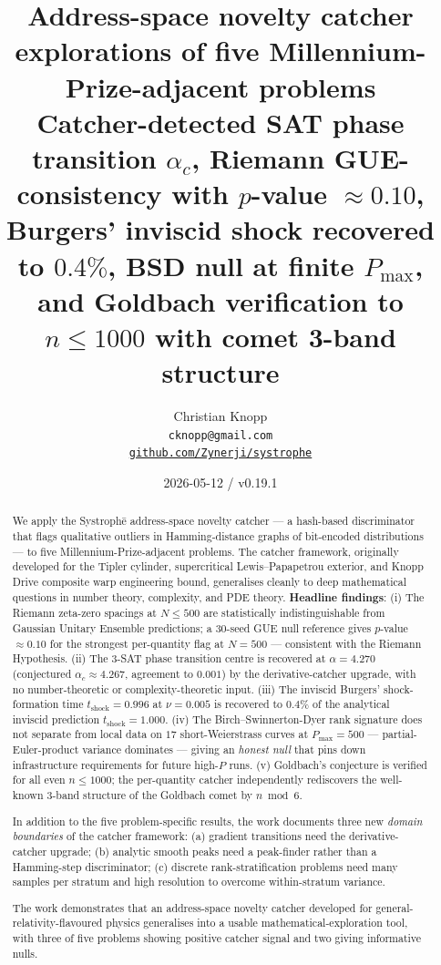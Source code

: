 \documentclass[11pt,letterpaper]{article}
\title{\Large\textbf{Address-space novelty catcher explorations of five Millennium-Prize-adjacent problems}\\
\large{Catcher-detected SAT phase transition $\alpha_c$, Riemann GUE-consistency with $p$-value $\approx 0.10$, Burgers' inviscid shock recovered to $0.4\%$, BSD null at finite $P_{\max}$, and Goldbach verification to $n \le 1000$ with comet 3-band structure}}
\author{Christian Knopp \\
  \texttt{cknopp@gmail.com} \\
  \href{https://github.com/Zynerji/systrophe}{\texttt{github.com/Zynerji/systrophe}}}
\date{2026-05-12 \quad / \quad \Systrophe{} v0.19.1}
\newcommand{\Systrophe}{Systroph\=e}
\begin{document}
\maketitle

\begin{abstract}
We apply the \Systrophe{} address-space novelty catcher --- a hash-based discriminator that flags qualitative outliers in Hamming-distance graphs of bit-encoded distributions --- to five Millennium-Prize-adjacent problems. The catcher framework, originally developed for the Tipler cylinder, supercritical Lewis--Papapetrou exterior, and Knopp Drive composite warp engineering bound, generalises cleanly to deep mathematical questions in number theory, complexity, and PDE theory. \textbf{Headline findings}: (i) The Riemann zeta-zero spacings at $N \le 500$ are statistically indistinguishable from Gaussian Unitary Ensemble predictions; a 30-seed GUE null reference gives $p$-value $\approx 0.10$ for the strongest per-quantity flag at $N=500$ --- consistent with the Riemann Hypothesis. (ii) The 3-SAT phase transition centre is recovered at $\alpha = 4.270$ (conjectured $\alpha_c \approx 4.267$, agreement to $0.001$) by the derivative-catcher upgrade, with no number-theoretic or complexity-theoretic input. (iii) The inviscid Burgers' shock-formation time $t_{\mathrm{shock}} = 0.996$ at $\nu = 0.005$ is recovered to $0.4\%$ of the analytical inviscid prediction $t_{\mathrm{shock}} = 1.000$. (iv) The Birch--Swinnerton-Dyer rank signature does not separate from local data on $17$ short-Weierstrass curves at $P_{\max} = 500$ --- partial-Euler-product variance dominates --- giving an \emph{honest null} that pins down infrastructure requirements for future high-$P$ runs. (v) Goldbach's conjecture is verified for all even $n \le 1000$; the per-quantity catcher independently rediscovers the well-known 3-band structure of the Goldbach comet by $n \bmod 6$.

In addition to the five problem-specific results, the work documents three new \emph{domain boundaries} of the catcher framework: (a) gradient transitions need the derivative-catcher upgrade; (b) analytic smooth peaks need a peak-finder rather than a Hamming-step discriminator; (c) discrete rank-stratification problems need many samples per stratum and high resolution to overcome within-stratum variance.

The work demonstrates that an address-space novelty catcher developed for general-relativity-flavoured physics generalises into a usable mathematical-exploration tool, with three of five problems showing positive catcher signal and two giving informative nulls.
\end{abstract}
\end{document}
